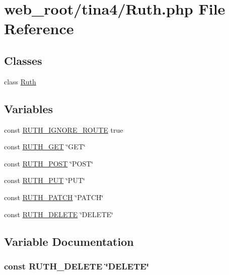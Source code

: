 \hypertarget{Ruth_8php}{}\section{web\+\_\+root/tina4/\+Ruth.php File Reference}
\label{Ruth_8php}
\subsection*{Classes}
\begin{DoxyCompactItemize}
\item 
class \hyperlink{classRuth}{Ruth}
\end{DoxyCompactItemize}
\subsection*{Variables}
\begin{DoxyCompactItemize}
\item 
const \hyperlink{Ruth_8php_a007827b20a122223418cd0bed933b32c}{R\+U\+T\+H\+\_\+\+I\+G\+N\+O\+R\+E\+\_\+\+R\+O\+U\+T\+E} true
\item 
const \hyperlink{Ruth_8php_acc73cd34b6fcffd15a4fdd050e0a86d8}{R\+U\+T\+H\+\_\+\+G\+E\+T} \char`\"{}G\+E\+T\char`\"{}
\item 
const \hyperlink{Ruth_8php_af749f90f066c3572c6dae5f01eb61af8}{R\+U\+T\+H\+\_\+\+P\+O\+S\+T} \char`\"{}P\+O\+S\+T\char`\"{}
\item 
const \hyperlink{Ruth_8php_a2b907fccde62015cd5962321135ce9d2}{R\+U\+T\+H\+\_\+\+P\+U\+T} \char`\"{}P\+U\+T\char`\"{}
\item 
const \hyperlink{Ruth_8php_a6b1071e153d1a5e0a9296990867f0b61}{R\+U\+T\+H\+\_\+\+P\+A\+T\+C\+H} \char`\"{}P\+A\+T\+C\+H\char`\"{}
\item 
const \hyperlink{Ruth_8php_abdf8b6f80e49d90cc5a6a6b79662fbbb}{R\+U\+T\+H\+\_\+\+D\+E\+L\+E\+T\+E} \char`\"{}D\+E\+L\+E\+T\+E\char`\"{}
\end{DoxyCompactItemize}


\subsection{Variable Documentation}
\hypertarget{Ruth_8php_abdf8b6f80e49d90cc5a6a6b79662fbbb}{}
\subsubsection[{R\+U\+T\+H\+\_\+\+D\+E\+L\+E\+T\+E}]{\setlength{\rightskip}{0pt plus 5cm}const R\+U\+T\+H\+\_\+\+D\+E\+L\+E\+T\+E \char`\"{}D\+E\+L\+E\+T\+E\char`\"{}}\label{Ruth_8php_abdf8b6f80e49d90cc5a6a6b79662fbbb}
\hypertarget{Ruth_8php_acc73cd34b6fcffd15a4fdd050e0a86d8}{}
